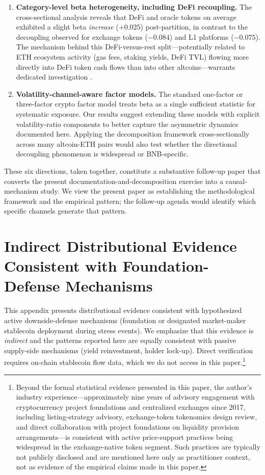 \documentclass[11pt,a4paper]{article}
\begin{document}
\begin{enumerate}
\item \textbf{Category-level beta heterogeneity, including DeFi recoupling.} The cross-sectional analysis reveals that DeFi and oracle tokens on average exhibited a slight beta \emph{increase} ($+0.025$) post-partition, in contrast to the decoupling observed for exchange tokens ($-0.084$) and L1 platforms ($-0.075$). The mechanism behind this DeFi-versus-rest split---potentially related to ETH ecosystem activity (gas fees, staking yields, DeFi TVL) flowing more directly into DeFi token cash flows than into other altcoins---warrants dedicated investigation \citep[see, e.g.,][on DeFi tokenomics]{schar2021}.

\item \textbf{Volatility-channel-aware factor models.} The standard one-factor or three-factor crypto factor model treats beta as a single sufficient statistic for systematic exposure. Our results suggest extending these models with explicit volatility-ratio components to better capture the asymmetric dynamics documented here. Applying the decomposition framework cross-sectionally across many altcoin-ETH pairs would also test whether the directional decoupling phenomenon is widespread or BNB-specific.
\end{enumerate}

These six directions, taken together, constitute a substantive follow-up paper that converts the present documentation-and-decomposition exercise into a causal-mechanism study. We view the present paper as establishing the methodological framework and the empirical pattern; the follow-up agenda would identify which specific channels generate that pattern.

\appendix

\section{Indirect Distributional Evidence Consistent with Foundation-Defense Mechanisms} \label{app:mm}

This appendix presents distributional evidence consistent with hypothesized active downside-defense mechanisms (foundation or designated market-maker stablecoin deployment during stress events). We emphasize that this evidence is \emph{indirect} and the patterns reported here are equally consistent with passive supply-side mechanisms (yield reinvestment, holder lock-up). Direct verification requires on-chain stablecoin flow data, which we do not access in this paper.\footnote{Beyond the formal statistical evidence presented in this paper, the author's industry experience---approximately nine years of advisory engagement with cryptocurrency project foundations and centralized exchanges since 2017, including listing-strategy advisory, exchange-token tokenomics design review, and direct collaboration with project foundations on liquidity provision arrangements---is consistent with active price-support practices being widespread in the exchange-native token segment. Such practices are typically not publicly disclosed and are mentioned here only as practitioner context, not as evidence of the empirical claims made in this paper.}
\end{document}

